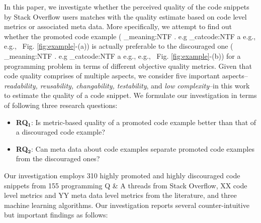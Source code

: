 \documentclass[conference]{IEEEtran}
\makeatletter
\newcommand\latinabbrev[1]{
  \peek_meaning:NTF . {%
    #1\@}%
  { \peek_catcode:NTF a {%
      #1., \@ }%
    {#1., \@}}}
\def\eg{\latinabbrev{e.g}}
\makeatother
\begin{document}
In this paper, we investigate whether the perceived quality of the code snippets by Stack Overflow users matches with the quality estimate based on code level metrics or associated meta data.
More specifically, we attempt to find out whether the promoted code example (\eg\ Fig. \ref{fig:example}-(a)) is actually preferable to the discouraged one (\eg\ Fig. \ref{fig:example}-(b)) for a programming problem in terms of different objective quality metrics. Given that code quality comprises of multiple aspects, we consider five important aspects--\emph{readability, reusability, changability, testability}, and \emph{low complexity}--in this work to estimate the quality of a code snippet. We formulate our investigation in terms of following three research questions:
\begin{itemize}
	\item \textbf{RQ$\mathbf{_1}$}: Is metric-based quality of a promoted code example better than that of a discouraged code example?
	\item \textbf{RQ$\mathbf{_2}$}: Can meta data about code examples separate promoted code examples from the discouraged ones?
\end{itemize}

Our investigation employs 310 highly promoted and highly discouraged code snippets from 155 programming Q \& A threads from Stack Overflow, XX code level metrics and YY meta data level metrics from the literature, and three machine learning algorithms. Our investigation reports several counter-intuitive but important findings as follows:  
\end{document}
